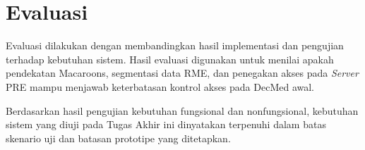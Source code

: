 \section{Evaluasi}
\label{sec:evaluasi}

Evaluasi dilakukan dengan membandingkan hasil implementasi dan pengujian terhadap kebutuhan sistem. Hasil evaluasi digunakan untuk menilai apakah pendekatan Macaroons, segmentasi data RME, dan penegakan akses pada \textit{Server} PRE mampu menjawab keterbatasan kontrol akses pada DecMed awal.

Berdasarkan hasil pengujian kebutuhan fungsional dan nonfungsional, kebutuhan sistem yang diuji pada Tugas Akhir ini dinyatakan terpenuhi dalam batas skenario uji dan batasan prototipe yang ditetapkan.



